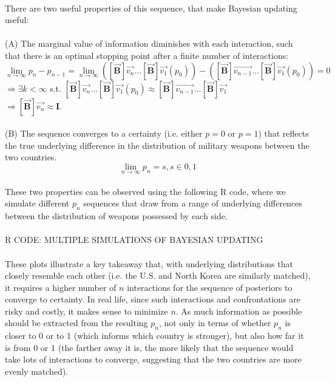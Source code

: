 \documentclass[12pt]{article}
\begin{document}
\\
There are two useful properties of this sequence, that make Bayesian updating useful:\\
\\
(A) The marginal value of information diminishes with each interaction, such that there is an optimal stopping point after a finite number of interactions:\\
$$\lim_{n\to\infty} p_n-p_{n-1} = \lim_{n\to\infty} ([\vec{\mathbf{B}}] \vec{v_n} \dots [\vec{\mathbf{B}}] \vec{v_1} (p_0)) - ([\vec{\mathbf{B}}] \vec{v_{n-1}} \dots [\vec{\mathbf{B}}] \vec{v_1} (p_0)) = 0 $$
$\Rightarrow \exists k<\infty$ s.t. $[\vec{\mathbf{B}}] \vec{v_n} \dots [\vec{\mathbf{B}}] \vec{v_1} (p_0) \approx [\vec{\mathbf{B}}] \vec{v_{n-1}} \dots [\vec{\mathbf{B}}] \vec{v_1}$\\
$\Rightarrow [\vec{\mathbf{B}}] \vec{v_n} \approx \mathbf{I}$.\\
\\
(B) The sequence converges to a certainty (i.e. either $p=0$ or $p=1$) that reflects the true underlying difference in the distribution of military weapons between the two countries.\\
$$\lim_{n\to\infty} p_n = s,  s\in{0,1}$$
\\
These two properties can be observed using the following R code, where we simulate different $p_n$ sequences that draw from a range of underlying differences between the distribution of weapons possessed by each side.\\
\\
R CODE: MULTIPLE SIMULATIONS OF BAYESIAN UPDATING\\
\\
These plots illustrate a key takeaway that, with underlying distributions that closely resemble each other (i.e. the U.S. and North Korea are similarly matched), it requires a higher number of $n$ interactions for the sequence of posteriors to converge to certainty. In real life, since such interactions and confrontations are risky and costly, it makes sense to minimize $n$. As much information as possible should be extracted from the resulting $p_n$, not only in terms of whether $p_n$ is closer to 0 or to 1 (which informs which country is stronger), but also how far it is from 0 or 1 (the farther away it is, the more likely that the sequence would take lots of interactions to converge, suggesting that the two countries are more evenly matched).
\end{document}
